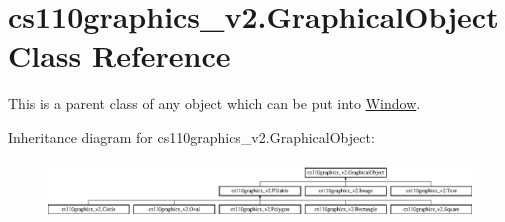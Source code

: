 \hypertarget{classcs110graphics__v2_1_1GraphicalObject}{}\section{cs110graphics\+\_\+v2.\+Graphical\+Object Class Reference}
\label{classcs110graphics__v2_1_1GraphicalObject}


This is a parent class of any object which can be put into \mbox{\hyperlink{classcs110graphics__v2_1_1Window}{Window}}.  


Inheritance diagram for cs110graphics\+\_\+v2.\+Graphical\+Object\+:\begin{figure}[H]
\begin{center}
\leavevmode
\includegraphics[height=1.527273cm]{classcs110graphics__v2_1_1GraphicalObject}
\end{center}
\end{figure}
